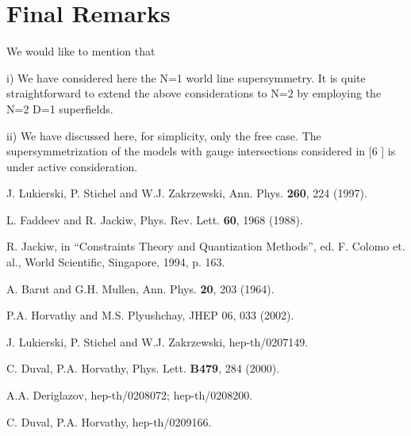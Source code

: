 \documentclass[a4paper,12pt]{article}
\begin{document}
\section{Final Remarks}
We would like to mention that

i) We have  considered here the N=1 world line supersymmetry. It is
quite straightforward to extend the above considerations to N=2 by
 employing  the N=2 D=1 superfields.

 ii) We have  discussed here, for simplicity, only the free case. The
 supersymmetrization of the models with gauge intersections 
considered
  in [6 ] is under active  consideration.



\begin{thebibliography}{99}

 J. Lukierski, P. Stichel and W.J. Zakrzewski,
 Ann. Phys.  {\bf  260},     224 (1997).

  L. Faddeev and R. Jackiw, Phys. Rev. Lett.   {\bf  60}, 
  1968 (1988).

   R. Jackiw, in ``Constraints Theory and
  Quantization Methods'', ed. F. Colomo et. al., World Scientific,
   Singapore, 1994, p. 163.

    A. Barut and G.H. Mullen, Ann. Phys.  {\bf   20},
    203 (1964).

     P.A. Horvathy and M.S. Plyushchay, JHEP 06, 033 
(2002).

 J. Lukierski, P. Stichel and W.J. Zakrzewski,
 hep-th/0207149.

  C. Duval, P.A. Horvathy, Phys. Lett.  {\bf  B479}, 
  284 (2000).

   A.A. Deriglazov, hep-th/0208072; hep-th/0208200.

   C. Duval, P.A. Horvathy, hep-th/0209166.

\end{thebibliography}
\end{document}
